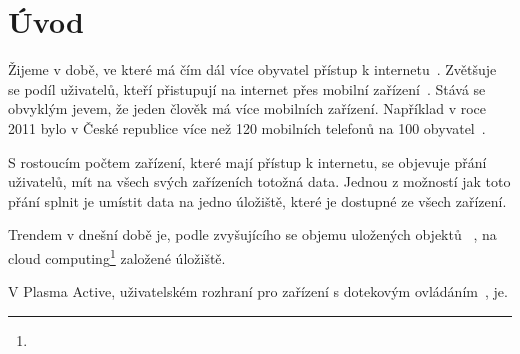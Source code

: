 \chapter{Úvod} 
Žijeme v době, ve které má čím dál více obyvatel přístup k internetu~\cite{InfTime}. Zvětšuje se podíl uživatelů, kteří přistupují na internet přes mobilní zařízení~\cite{InfTime}. Stává se obvyklým jevem, že jeden člověk má více mobilních zařízení. Například v roce 2011 bylo v České republice více než 120 mobilních telefonů na 100 obyvatel~\cite{InfTime}.

S rostoucím počtem zařízení, které mají přístup k internetu, se objevuje přání uživatelů, mít na všech svých zařízeních totožná data. Jednou z možností jak toto přání splnit je umístit data na jedno úložiště, které je dostupné ze všech zařízení.

Trendem v dnešní době je, podle zvyšujícího se objemu uložených objektů ~\cite{AmazonS3}, na cloud computing\footnote{} založené úložiště. 

V Plasma Active, uživatelském rozhraní pro zařízení s dotekovým ovládáním~\cite{PA}, je. 